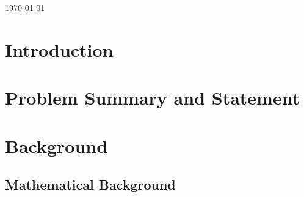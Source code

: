 \documentclass{article}
\theoremstyle{definition}
\begin{document}
\begin{titlepage}


{\large \today}\\[2cm] %


 

\vfill %

\end{titlepage}

\tableofcontents \newpage

\section{Introduction}



\section{Problem Summary and Statement}





\section{Background}


\subsection{Mathematical Background}
\end{document}
